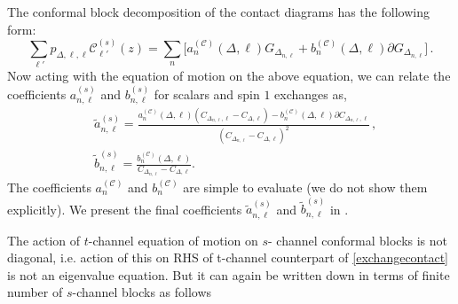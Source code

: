 \documentclass[12pt]{article}
\numberwithin{equation}{section}
\def\D{\Delta}
\begin{document}
The conformal block decomposition of the contact diagrams has the following form:
\begin{equation} \label{decomc}
\sum_{\ell'}   p_{\D,\ell,\ell} \mathcal{C}^{(s)}_{\ell'}(z)=\sum_{n} \Big[{a}_{n}^{(\mathcal{C})}(\D,\ell) G_{\D_{n,\ell}}+{b}_{n}^{(\mathcal{C})}(\D,\ell) \partial G_{\D_{n,\ell}}\Big]\,.
\end{equation}
Now acting with the equation of motion on the above equation, we can relate the coefficients $a^{(s)}_{n,\ell}$ and $b^{(s)}_{n,\ell}$ for scalars and spin $1$ exchanges as,
\begin{equation}
\begin{split} 
& \widetilde{a}^{(s)}_{n,\ell}=\frac{{a}_{n}^{(\mathcal{C})}(\D,\ell)(C_{\D_{n,\ell},\ell}-C_{\D,\ell})-b^{(\mathcal{C})}_n(\D,\ell)\partial C_{\D_{n,\ell},\ell}}{(C_{\Delta_{n,\ell}}-C_{\Delta,\ell})^2}\,,\\
& \widetilde{b}^{(s)}_{n,\ell}=\frac{{b}_{n}^{(\mathcal{C})}(\D,\ell)}{C_{\Delta_{n,\ell}}-C_{\Delta,\ell}}.
\end{split}
\end{equation}
The coefficients $a_{n}^{(\mathcal{C})}$ and $b_{n}^{(\mathcal{C})}$ are simple to evaluate (we do not show them explicitly). We present the final coefficients $\widetilde{a}^{(s)}_{n,\ell}$ and $\widetilde{b}^{(s)}_{n,\ell}$ in \cite{notebook}.


The action of $t$-channel equation of motion on $s$- channel conformal blocks is not diagonal, i.e. action of this on RHS of t-channel counterpart of \eqref{exchangecontact} is not an eigenvalue equation. But it can again be written down in terms of finite number of $s$-channel blocks as follows
\end{document}
